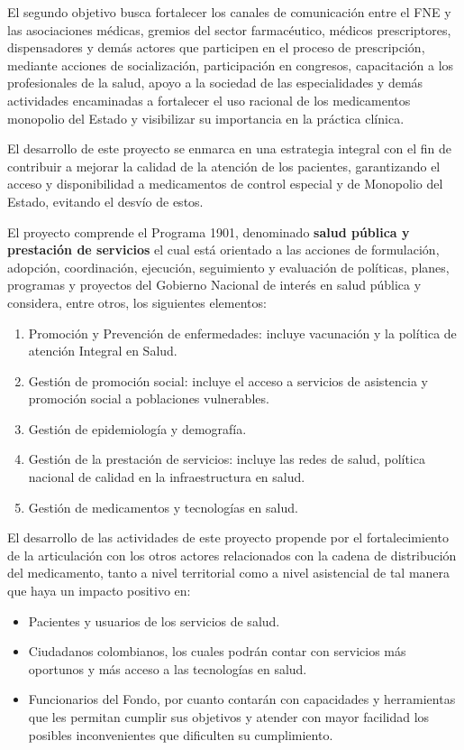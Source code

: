 \documentclass[
  oneside]{book}
\begin{document}
El segundo objetivo busca fortalecer los canales de comunicación entre el FNE y las asociaciones médicas, gremios del sector farmacéutico, médicos prescriptores, dispensadores y demás actores que participen en el proceso de prescripción, mediante acciones de socialización, participación en congresos, capacitación a los profesionales de la salud, apoyo a la sociedad de las especialidades y demás actividades encaminadas a fortalecer el uso racional de los medicamentos monopolio del Estado y visibilizar su importancia en la práctica clínica.

El desarrollo de este proyecto se enmarca en una estrategia integral con el fin de contribuir a mejorar la calidad de la atención de los pacientes, garantizando el acceso y disponibilidad a medicamentos de control especial y de Monopolio del Estado, evitando el desvío de estos.

El proyecto comprende el Programa 1901, denominado \textbf{salud pública y prestación de servicios} el cual está orientado a las acciones de formulación, adopción, coordinación, ejecución, seguimiento y evaluación de políticas, planes, programas y proyectos del Gobierno Nacional de interés en salud pública y considera, entre otros, los siguientes elementos:

\begin{enumerate}
\def\labelenumi{\arabic{enumi}.}
\item
  Promoción y Prevención de enfermedades: incluye vacunación y la política de atención Integral en Salud.
\item
  Gestión de promoción social: incluye el acceso a servicios de asistencia y promoción social a poblaciones vulnerables.
\item
  Gestión de epidemiología y demografía.
\item
  Gestión de la prestación de servicios: incluye las redes de salud, política nacional de calidad en la infraestructura en salud.
\item
  Gestión de medicamentos y tecnologías en salud.
\end{enumerate}

El desarrollo de las actividades de este proyecto propende por el fortalecimiento de la articulación con los otros actores relacionados con la cadena de distribución del medicamento, tanto a nivel territorial como a nivel asistencial de tal manera que haya un impacto positivo en:

\begin{itemize}
\item
  Pacientes y usuarios de los servicios de salud.
\item
  Ciudadanos colombianos, los cuales podrán contar con servicios más oportunos y más acceso a las tecnologías en salud.
\item
  Funcionarios del Fondo, por cuanto contarán con capacidades y herramientas que les permitan cumplir sus objetivos y atender con mayor facilidad los posibles inconvenientes que dificulten su cumplimiento.
\end{itemize}
\end{document}
